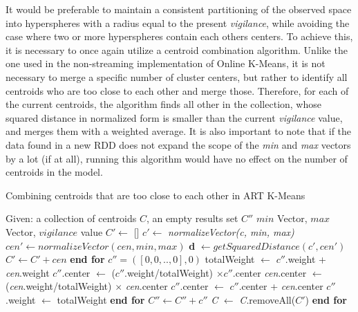 \documentclass{l4proj}
\begin{document}
It would be preferable to maintain a consistent partitioning of the observed space into hyperspheres with a radius equal to the present \textit{vigilance}, while avoiding the case where two or more hyperspheres contain each others centers. To achieve this, it is necessary to once again utilize a centroid combination algorithm. Unlike the one used in the non-streaming implementation of Online K-Means, it is not necessary to merge a specific number of cluster centers, but rather to identify all centroids who are too close to each other and merge those. Therefore, for each of the current centroids, the algorithm finds all other in the collection, whose squared distance in normalized form is smaller than the current \textit{vigilance} value, and merges them with a weighted average. It is also important to note that if the data found in a new RDD does not expand the scope of the \textit{min} and \textit{max} vectors by a lot (if at all), running this algorithm would have no effect on the number of centroids in the model.

\begin{algorithm}[H]
\caption{Combining centroids that are too close to each other in ART K-Means}
\begin{algorithmic}[1]
\State Given: a collection of centroids $C$, an empty results set $C''$ 
\State \hspace{1.1cm} $min$ Vector, $max$ Vector, $vigilance$ value
    \State $C' \gets$ []
    \State $c' \gets$ \textit{normalizeVector(c, min, max)}
        \State $cen' \gets normalizeVector(cen, min, max)$
        \State \textbf{d} $\gets getSquaredDistance(c', cen')$
            \State $C' \gets C' + cen$
        \EndIf
    \EndFor
    \State \textbf{end for}
    \State $c'' = ([0 ,0, .., 0], 0)$
    	\State totalWeight $\gets$ $c''$.weight + \textit{cen}.weight
        \State $c''$.center $\gets$ ($c''$.weight/totalWeight) $\times c''$.center
        \State \textit{cen}.center $\gets$ (\textit{cen}.weight/totalWeight) $\times$ \textit{cen}.center
        \State $c''$.center $\gets$ $c''$.center + \textit{cen}.center
        \State $c''$.weight $\gets$ totalWeight
    \EndFor
    \State \textbf{end for}
    \State $C'' \gets C'' + c''$
    \State \textit{C} $\gets$ \textit{C}.removeAll($C'$)
\EndFor
\State \textbf{end for}
\end{algorithmic}
\end{algorithm}
\end{document}
